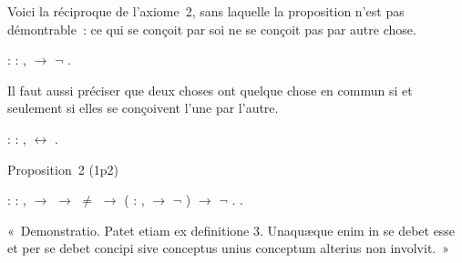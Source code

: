 \documentclass[12pt]{report}
\begin{document}
 Voici la réciproque de l'axiome 2, sans laquelle la proposition
  n'est pas démontrable : ce qui se conçoit par soi ne se conçoit pas
  par autre chose. \begin{coqdoccode}
\coqdocemptyline
\coqdocindent{1.00em}
 : \coqdoceol
\coqdocindent{2.00em}
\coqdockw{\ensuremath{\forall}} : , \coqdoceol
\coqdocindent{3.00em}
  \ensuremath{\rightarrow} \coqdoceol
\coqdocindent{3.00em}
\ensuremath{\lnot} .\coqdoceol
\coqdocemptyline
\end{coqdoccode}
Il faut aussi préciser que deux choses ont quelque chose en commun
  si et seulement si elles se conçoivent l'une par l'autre. \begin{coqdoccode}
\coqdocemptyline
\coqdocindent{1.00em}
 :\coqdoceol
\coqdocindent{2.00em}
\coqdockw{\ensuremath{\forall}}  : ,\coqdoceol
\coqdocindent{3.00em}
   \coqdoceol
\coqdocindent{3.00em}
\ensuremath{\leftrightarrow} \coqdoceol
\coqdocindent{3.00em}
  .\coqdoceol
\coqdocemptyline
\end{coqdoccode}
Proposition 2 (1p2) \begin{coqdoccode}
\coqdocindent{1.00em}
 :\coqdoceol
\coqdocindent{2.00em}
\coqdockw{\ensuremath{\forall}}  : ,\coqdoceol
\coqdocindent{3.00em}
  \ensuremath{\rightarrow} \coqdoceol
\coqdocindent{3.00em}
  \ensuremath{\rightarrow} \coqdoceol
\coqdocindent{3.00em}
 \ensuremath{\not=}  \ensuremath{\rightarrow}\coqdoceol
\coqdocindent{3.00em}
(\coqdockw{\ensuremath{\forall}} : , \coqdoceol
\coqdocindent{4.50em}
   \ensuremath{\rightarrow} \ensuremath{\lnot}  ) \ensuremath{\rightarrow}\coqdoceol
\coqdocindent{3.00em}
\ensuremath{\lnot}  .\coqdoceol
\coqdocemptyline
\coqdocindent{1.00em}
.\coqdoceol
\end{coqdoccode}
« Demonstratio. Patet etiam ex definitione 3. Unaquæque enim in
    se debet esse et per se debet concipi sive conceptus unius conceptum
    alterius non involvit. » 
\end{document}
